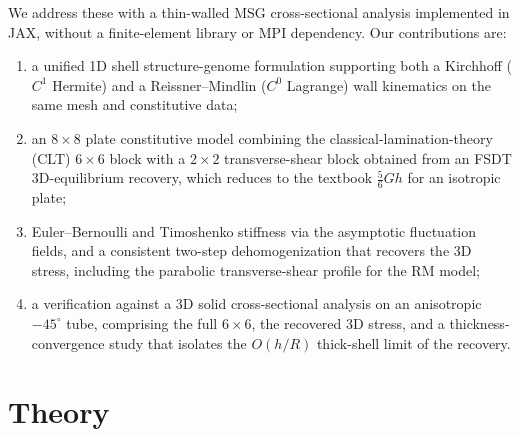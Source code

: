 \documentclass[preprint,12pt]{elsarticle}
\newcommand{\hR}{h/R}
\begin{document}
We address these with a thin-walled MSG cross-sectional analysis implemented in
JAX, without a finite-element library or MPI dependency. Our contributions are:
\begin{enumerate}
\item a unified 1D shell structure-genome formulation supporting both a
Kirchhoff ($C^{1}$ Hermite) and a Reissner--Mindlin ($C^{0}$ Lagrange) wall
kinematics on the same mesh and constitutive data;
\item an $8\times8$ plate constitutive model combining the
classical-lamination-theory (CLT) $6\times6$ block with a $2\times2$
transverse-shear block obtained from an FSDT 3D-equilibrium recovery, which
reduces to the textbook $\tfrac{5}{6}Gh$ for an isotropic plate;
\item Euler--Bernoulli and Timoshenko stiffness via the asymptotic fluctuation
fields, and a consistent two-step dehomogenization that recovers the 3D stress,
including the parabolic transverse-shear profile for the RM model;
\item a verification against a 3D solid cross-sectional analysis on an
anisotropic $-45^{\circ}$ tube, comprising the full $6\times6$, the recovered
3D stress, and a thickness-convergence study that isolates the $O(\hR)$
thick-shell limit of the recovery.
\end{enumerate}

\section{Theory}
\end{document}

